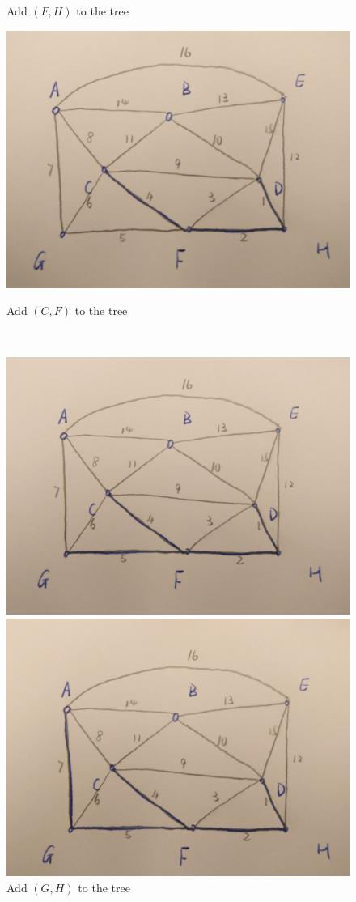 \documentclass[11pt]{article}
\begin{document}
\begin{figure}[!h]
\begin{minipage}[t]{0.50\linewidth}
		\caption{Add $(F,H)$ to the tree}
		\label{fig:subfig1:c}
	\end{minipage}
	\begin{minipage}[t]{0.50\linewidth}
		\centering
		\includegraphics[width=0.75\linewidth]{Figure/1a4.jpg}
		\caption{Add $(C,F)$ to the tree}
		\label{fig:subfig1:d}
	\end{minipage}
\\
	\begin{minipage}[t]{0.50\linewidth}
		\centering
		\includegraphics[width=0.75\linewidth]{Figure/1a5.jpg}
		\caption{Add $(G,H)$ to the tree}
		\label{fig:subfig1:e}
	\end{minipage}
	\begin{minipage}[t]{0.50\linewidth}
		\centering
		\includegraphics[width=0.75\linewidth]{Figure/1a6.jpg}

\end{minipage}
\end{figure}
\end{document}
